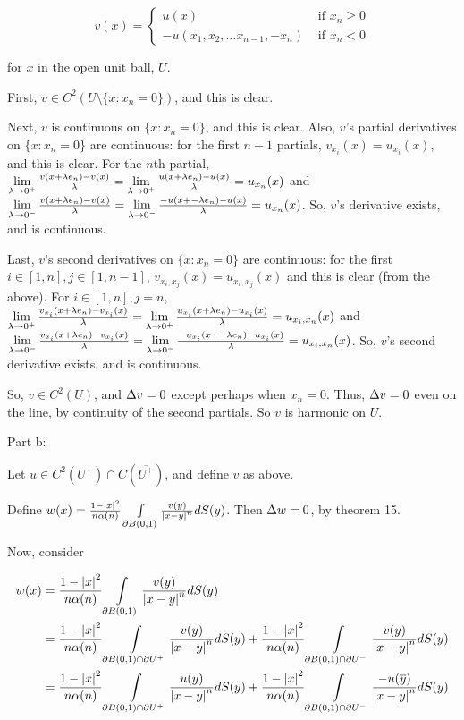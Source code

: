\documentclass[a4paper,12pt]{article}
\begin{document}
\begin{displaymath}
v(x) =
   \left\{
     \begin{array}{lr}
       u(x) & \text{ if } x_n \geq 0\\
       -u(x_1,x_2, \ldots x_{n-1}, -x_n) & \text{ if } x_n < 0
     \end{array}
   \right.
\end{displaymath}

for $x$ in the open unit ball, $U$.

First, $v \in C^2( U \setminus \{x: x_n = 0\})$, and this is clear.

Next, $v$ is continuous on $\{x: x_n = 0\}$, and this is clear. Also, $v$'s partial derivatives on $\{x: x_n = 0\}$ are continuous: for the first $n-1$ partials, $v_{x_i}(x) = u_{x_i}(x)$, and this is clear. For the $n$th partial, $\lim\limits_{\lambda \to 0^+} \frac{v(x + \lambda e_n) - v(x)}{\lambda} = \lim\limits_{\lambda \to 0^+} \frac{u(x + \lambda e_n) - u(x)}{\lambda} = u_{x_n}(x)$ and $\lim\limits_{\lambda \to 0^-} \frac{v(x + \lambda e_n) - v(x)}{\lambda} = \lim\limits_{\lambda \to 0^-} \frac{-u(x + -\lambda e_n) - u(x)}{\lambda} = u_{x_n}(x)$. So, $v$'s derivative exists, and is continuous.

Last, $v$'s second derivatives on $\{x: x_n = 0\}$ are continuous: for the first $i \in [1,n], j \in [1,n-1]$, $v_{x_i, x_j}(x) = u_{x_i, x_j}(x)$ and this is clear (from the above). For $i \in [1,n], j = n$, $\lim\limits_{\lambda \to 0^+} \frac{v_{x_i}(x + \lambda e_n) - v_{x_i}(x)}{\lambda} = \lim\limits_{\lambda \to 0^+} \frac{u_{x_i}(x + \lambda e_n) - u_{x_i}(x)}{\lambda} = u_{x_i,x_n}(x)$ and $\lim\limits_{\lambda \to 0^-} \frac{v_{x_i}(x + \lambda e_n) - v_{x_i}(x)}{\lambda} = \lim\limits_{\lambda \to 0^-} \frac{-u_{x_i}(x + -\lambda e_n) - u_{x_i}(x)}{\lambda} = u_{x_i,x_n}(x)$. So, $v$'s second derivative exists, and is continuous.

So, $v \in C^2(U)$, and $\Delta v = 0$ except perhaps when $x_n = 0$. Thus, $\Delta v = 0$ even on the line, by continuity of the second partials. So $v$ is harmonic on $U$.

\shunt

Part b:

Let $u \in C^2(U^+) \cap C(\overline{U^+})$, and define $v$ as above.

Define $w(x) = \frac{1-\left\lvert x \right\rvert^2}{n \alpha(n)} \int\limits_{\partial B(0,1)} \frac{v(y)}{\left\lvert x-y \right\rvert^n} dS(y)$. Then $\Delta w = 0$, by theorem 15.

Now, consider

\begin{align*}
w(x) &= \frac{1-\left\lvert x \right\rvert^2}{n \alpha(n)} \int\limits_{\partial B(0,1)} \frac{v(y)}{\left\lvert x-y \right\rvert^n} dS(y)\\
&= \frac{1-\left\lvert x \right\rvert^2}{n \alpha(n)} \int\limits_{\partial B(0,1) \cap \partial U^+} \frac{v(y)}{\left\lvert x-y \right\rvert^n} dS(y) + \frac{1-\left\lvert x \right\rvert^2}{n \alpha(n)} \int\limits_{\partial B(0,1) \cap \partial U^-} \frac{v(y)}{\left\lvert x-y \right\rvert^n} dS(y)\\
&= \frac{1-\left\lvert x \right\rvert^2}{n \alpha(n)} \int\limits_{\partial B(0,1) \cap \partial U^+} \frac{u(y)}{\left\lvert x-y \right\rvert^n} dS(y) + \frac{1-\left\lvert x \right\rvert^2}{n \alpha(n)} \int\limits_{\partial B(0,1) \cap \partial U^-} \frac{-u(\overline{y})}{\left\lvert x-y \right\rvert^n} dS(y)\\
\end{align*}
\end{document}
